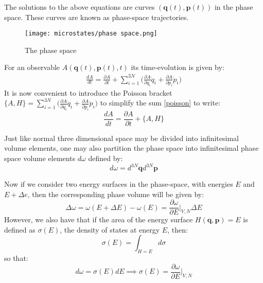 \documentclass[a4paper,11pt,oneside]{book}
\begin{document}
The solutions to the above equations are curves $(\textbf{q}(t), \textbf{p}(t))$ in the phase space. These curves are known as phase-space trajectories. 

\begin{figure}[h!]
    \centering
    \texttt{[image: microstates/phase space.png]}
    \caption{The phase space}
    \label{fig:my_label}
\end{figure}


For an observable $A(\textbf{q}(t), \textbf{p}(t),t)$ its time-evolution is given by:
\begin{align} \label{poisson}
    \frac{dA}{dt} = \frac{\partial A}{\partial t} + \sum_{i=1}^{3N} \bigg(\frac{\partial A}{\partial q_i} \dot{q}_i + \frac{\partial A}{\partial p_i} \dot{p}_i\bigg)
\end{align}
It is now convenient to introduce the Poisson bracket $\{A,H\}=\sum \limits_{i=1}^{3N} \big(\frac{\partial A}{\partial q_i} \dot{q}_i + \frac{\partial A}{\partial p_i} \dot{p}_i\big)$ to simplify the sum \eqref{poisson} to write:
\begin{equation}
    \frac{dA}{dt} = \frac{\partial A}{\partial t} + \{A,H\}
\end{equation}

Just like normal three dimensional space may be divided into infinitesimal volume elements, one may also partition the phase space into infinitesimal phase space volume elements $d \omega$ defined by:
\begin{equation}
    d\omega = d^{3N} \textbf{q} d^{3N}\textbf{p}
\end{equation} 

Now if we consider two energy surfaces in the phase-space, with energies $E$ and $E+\Delta e$, then the corresponding phase volume will be given by:
\begin{equation}
    \Delta \omega = \omega(E+\Delta E) - \omega(E) = \frac{\partial \omega}{\partial E}\bigg|_{V,N} \Delta E
\end{equation}
However, we also have that if the area of the energy surface $H(\textbf{q},\textbf{p})=E$ is defined as $\sigma(E)$, the density of states at energy $E$, then:
\begin{equation}
    \sigma(E) = \int_{H=E} d\sigma
\end{equation}
so that:
\begin{equation}
     d\omega = \sigma(E) dE \implies \boxed{\sigma(E) = \frac{\partial \omega}{\partial E}\bigg|_{V,N}}
\end{equation}
\end{document}
